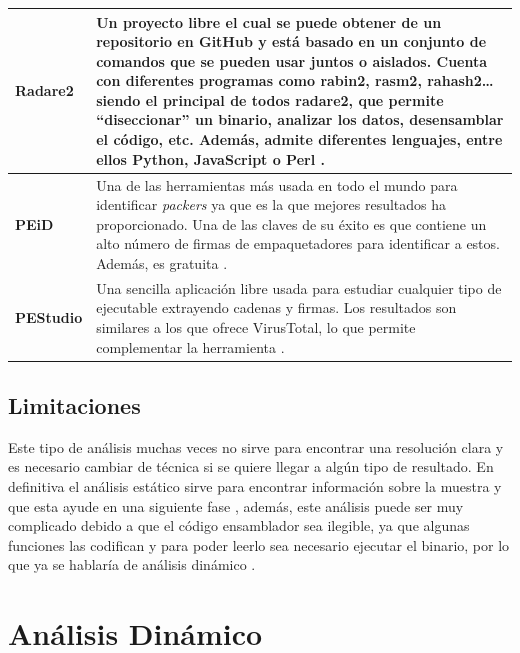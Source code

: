 \begin{table}[htb!]
\begin{tabular}{|l|p{12cm}|}
     \textbf{Radare2}& Un proyecto libre el cual se puede obtener de un repositorio en GitHub y está basado en un conjunto de comandos que se pueden usar juntos o aislados. Cuenta con diferentes programas como rabin2, rasm2, rahash2… siendo el principal de todos radare2, que permite “diseccionar” un binario, analizar los datos, desensamblar el código, etc. Además, admite diferentes lenguajes, entre ellos Python, JavaScript o Perl \cite{RAD2ORG}. \\ \hline
    
    \textbf{PEiD}& Una de las herramientas más usada en todo el mundo para identificar \textit{packers} ya que es la que mejores resultados ha proporcionado. 
    Una de las claves de su éxito es que contiene un alto número de firmas de empaquetadores para identificar a estos. Además, es gratuita \cite{Kancherla2015}.\\ \hline
    
    \textbf{PEStudio}& Una sencilla aplicación libre usada para estudiar cualquier tipo de ejecutable extrayendo cadenas y firmas. Los resultados son similares a los que ofrece VirusTotal, lo que permite complementar la herramienta \cite{Amiruddin2020}.\\ \hline
\end{tabular}
\label{tab:toolsEst}
\end{table}

\subsection{Limitaciones}

\noindent Este tipo de análisis muchas veces no sirve para encontrar una resolución clara y es necesario cambiar de técnica si se quiere llegar a algún tipo de resultado. En definitiva el análisis estático sirve para encontrar información sobre la muestra y que esta ayude en una siguiente fase \cite{Mohanta2020}, además, este análisis puede ser muy complicado debido a que el código ensamblador sea ilegible, ya que algunas funciones las codifican y para poder leerlo sea necesario ejecutar el binario, por lo que ya se hablaría de análisis dinámico \cite{SIM2020}.

\section{Análisis Dinámico} \label{sec:adinamico}

